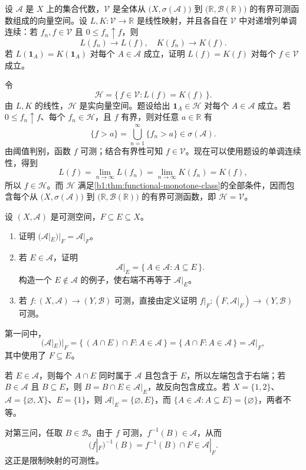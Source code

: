\begin{exercise}
\label{b1:ex:06}
设 \(\mathcal A\) 是 \(X\) 上的集合代数，\(\mathcal V\) 是全体从 \(\bigl(X,\sigma(\mathcal A)\bigr)\) 到 \(\bigl(\mathbb R,\mathcal B(\mathbb R)\bigr)\) 的有界可测函数组成的向量空间。设 \(L,K:\mathcal V\to\mathbb R\) 是线性映射，并且各自在 \(\mathcal V\) 中对递增列单调连续：若 \(f_n,f\in\mathcal V\) 且 \(0\leq f_n\uparrow f\)，则
\[
L(f_n)\longrightarrow L(f),
\quad
K(f_n)\longrightarrow K(f).
\]
若 \(L(\mathbf 1_A)=K(\mathbf 1_A)\) 对每个 \(A\in\mathcal A\) 成立，证明 \(L(f)=K(f)\) 对每个 \(f\in\mathcal V\) 成立。
\end{exercise}
\begin{solution}
令
\[
\mathcal H=\{\,f\in\mathcal V:L(f)=K(f)\,\}.
\]
由 \(L,K\) 的线性，\(\mathcal H\) 是实向量空间。题设给出 \(\mathbf 1_A\in\mathcal H\) 对每个 \(A\in\mathcal A\) 成立。若 \(0\leq f_n\uparrow f\)、每个 \(f_n\in\mathcal H\)，且 \(f\) 有界，则对任意 \(a\in\mathbb R\) 有
\[
\{f>a\}
=\bigcup_{n=1}^{\infty}\{f_n>a\}
\in\sigma(\mathcal A).
\]
由阈值判别，函数 \(f\) 可测；结合有界性可知 \(f\in\mathcal V\)。现在可以使用题设的单调连续性，得到
\[
L(f)=\lim_{n\to\infty}L(f_n)
=\lim_{n\to\infty}K(f_n)=K(f),
\]
所以 \(f\in\mathcal H\)。而 \(\mathcal H\) 满足\cref{b1:thm:functional-monotone-class}的全部条件，因而包含每个从 \(\bigl(X,\sigma(\mathcal A)\bigr)\) 到 \(\bigl(\mathbb R,\mathcal B(\mathbb R)\bigr)\) 的有界可测函数，即 \(\mathcal H=\mathcal V\)。
\end{solution}

\begin{exercise}
\label{b1:ex:07}
设 \((X,\mathcal A)\) 是可测空间，\(F\subseteq E\subseteq X\)。
\begin{enumerate}
  \item \label{b1:item:ex07-1}
  证明 \((\mathcal A|_E)|_F=\mathcal A|_F\)。
  \item \label{b1:item:ex07-2}
  若 \(E\in\mathcal A\)，证明
  \[
  \mathcal A|_E=\{\,A\in\mathcal A:A\subseteq E\,\}.
  \]
  构造一个 \(E\notin\mathcal A\) 的例子，使右端不再等于 \(\mathcal A|_E\)。
  \item \label{b1:item:ex07-3}
  若 \(f:(X,\mathcal A)\to(Y,\mathcal B)\) 可测，直接由定义证明 \(f|_F:(F,\mathcal A|_F)\to(Y,\mathcal B)\) 可测。
\end{enumerate}
\end{exercise}
\begin{solution}
第一问中，
\[
(\mathcal A|_E)|_F
=\{\,(A\cap E)\cap F:A\in\mathcal A\,\}
=\{\,A\cap F:A\in\mathcal A\,\}
=\mathcal A|_F,
\]
其中使用了 \(F\subseteq E\)。

若 \(E\in\mathcal A\)，则每个 \(A\cap E\) 同时属于 \(\mathcal A\) 且包含于 \(E\)，所以左端包含于右端；若 \(B\in\mathcal A\) 且 \(B\subseteq E\)，则 \(B=B\cap E\in\mathcal A|_E\)，故反向包含成立。若 \(X=\{1,2\}\)、\(\mathcal A=\{\varnothing,X\}\)、\(E=\{1\}\)，则
\(
\mathcal A|_E=\{\varnothing,E\}
\)，而 \(\{A\in\mathcal A:A\subseteq E\}=\{\varnothing\}\)，两者不等。

对第三问，任取 \(B\in\mathcal B\)。由于 \(f\) 可测，\(f^{-1}(B)\in\mathcal A\)，从而
\[
(f|_F)^{-1}(B)
=f^{-1}(B)\cap F
\in\mathcal A|_F.
\]
这正是限制映射的可测性。
\end{solution}


